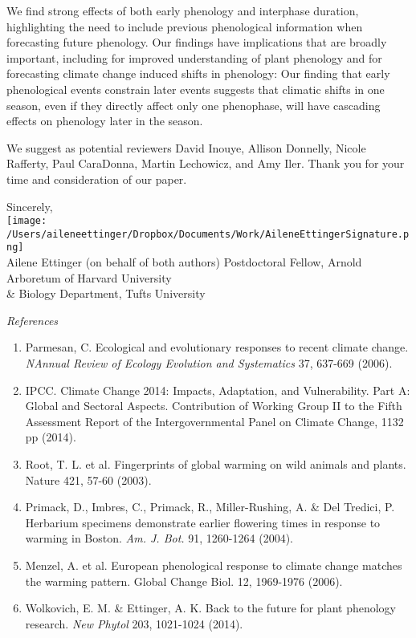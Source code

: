 \documentclass[10.95pt,a4paper]{letter}
\begin{document}
\begin{letter}{}
We find strong effects of both early phenology and interphase duration, highlighting the need to include previous phenological information when forecasting future phenology. Our findings have implications that are broadly important, including  for improved understanding of plant phenology and for forecasting climate change induced shifts in phenology: Our finding that early phenological events constrain later events suggests that climatic shifts in one season, even if they directly affect only one phenophase, will have cascading effects on phenology later in the season. 

We suggest as potential reviewers David Inouye, Allison Donnelly, Nicole Rafferty, Paul CaraDonna, Martin Lechowicz, and Amy Iler. Thank you for your time and consideration of our paper. 


Sincerely,\\

\texttt{[image: /Users/aileneettinger/Dropbox/Documents/Work/AileneEttingerSignature.png]} \\
Ailene Ettinger (on behalf of both authors)
Postdoctoral Fellow, Arnold Arboretum of Harvard University \\ \& Biology Department, Tufts University


\clearpage


\noindent \emph{References}
\begin{footnotesize}
\begin{enumerate}
\item Parmesan, C. Ecological and evolutionary responses to recent climate change.  \emph{NAnnual Review of Ecology Evolution and Systematics} 37, 637-669 (2006).
\item  IPCC. Climate Change 2014: Impacts, Adaptation, and Vulnerability. Part A: Global and Sectoral Aspects. Contribution of Working Group II to the Fifth Assessment Report of the Intergovernmental Panel on Climate Change, 1132 pp (2014).
\item Root, T. L. et al. Fingerprints of global warming on wild animals and plants. Nature 421, 57-60 (2003).
\item Primack, D., Imbres, C., Primack, R., Miller-Rushing, A. & Del Tredici, P. Herbarium specimens demonstrate earlier flowering times in response to warming in Boston.  \emph{Am. J. Bot.} 91, 1260-1264 (2004).
\item Menzel, A. et al. European phenological response to climate change matches the warming pattern. Global Change Biol. 12, 1969-1976 (2006).
\item Wolkovich, E. M. & Ettinger, A. K. Back to the future for plant phenology research. \emph{New Phytol} 203, 1021-1024 (2014).
\end{enumerate}
\end{footnotesize}



\end{letter}
\end{document}
